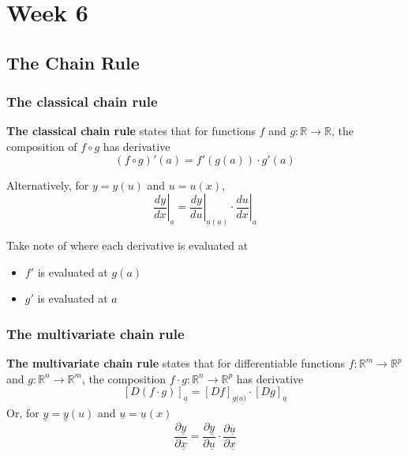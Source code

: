 \chapter{Week 6}

   \section{The Chain Rule}

   \subsection{The classical chain rule}
   \begin{framed}
      \textbf{The classical chain rule} states that for functions $f$ and $g: \mathbb{R} \to \mathbb{R}$, the composition of $f \circ g$ has derivative \[
         (f \circ g)'(a) = f' (g(a)) \cdot g ' (a)
      \] 

      Alternatively, for $y = y(u)$ and $u = u(x)$, \[
         \left. \frac{dy}{dx} \right|_{a} = \left. \frac{dy}{du} \right|_{u(a)} \cdot \left. \frac{du}{dx} \right|_{a} 
      \] 
   \end{framed}

   Take note of where each derivative is evaluated at
   \begin{itemize}
      \item $f'$ is evaluated at $g(a)$ 
      \item $g'$ is evaluated at $a$
   \end{itemize}

   \subsection{The multivariate chain rule}

   \begin{framed}
      \textbf{The multivariate chain rule} states that for differentiable functions $f: \mathbb{R}^m \to \mathbb{R}^p$ and $g: \mathbb{R}^n \to \mathbb{R}^m$, the composition $f \cdot g : \mathbb{R}^n \to \mathbb{R}^p$ has derivative 
         \[
         \left[ D (f \cdot g)  \right]_{ \underline{a}} = \left[ D f \right]_{g( \underline{a)}}  \cdot \left[ D g \right]_{ \underline{a}} 
         \] 
         Or, for $ \underline{y} = \underline{y}(u)$ and $ \underline{u} = \underline{u}(x)$
         \[
           \frac{\partial \underline{y}}{ \partial \underline{x} } =  
           \frac{\partial \underline{y}}{ \partial \underline{u} } \cdot
           \frac{\partial \underline{u}}{ \partial \underline{x} }
         \] 
   \end{framed}

